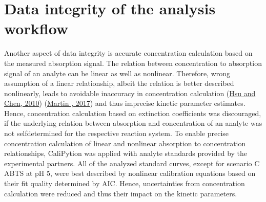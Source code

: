 \documentclass[letterpaper,12pt,english]{jupyterBook}
\begin{document}
\section{Data integrity of the analysis workflow}
\label{\detokenize{discussion:data-integrity-of-the-analysis-workflow}}
\sphinxAtStartPar
Another aspect of data integrity is accurate concentration calculation based on the measured absorption signal. The relation between concentration to absorption signal of an analyte can be linear as well as non\sphinxhyphen{}linear. Therefore, wrong assumption of a linear relationship, albeit the relation is better described non\sphinxhyphen{}linearly, leads to avoidable inaccuracy in concentration calculation (\hyperlink{cite.references:id14}{Hsu and Chen, 2010}) (\hyperlink{cite.references:id15}{Martin , 2017}) and thus imprecise kinetic parameter estimates.
Hence, concentration calculation based on extinction coefficients was discouraged, if the underlying relation between absorption and concentration of an analyte was not self\sphinxhyphen{}determined for the respective reaction system.
To enable precise concentration calculation of linear and non\sphinxhyphen{}linear absorption to concentration relationships, CaliPytion was applied with analyte standards provided by the experimental partners.
All of the analyzed standard curves, except for scenario C ABTS at pH 5, were best described by non\sphinxhyphen{}linear calibration equations based on their fit quality determined by AIC. Hence, uncertainties from concentration calculation were reduced and thus their impact on the kinetic parameters.
\end{document}
